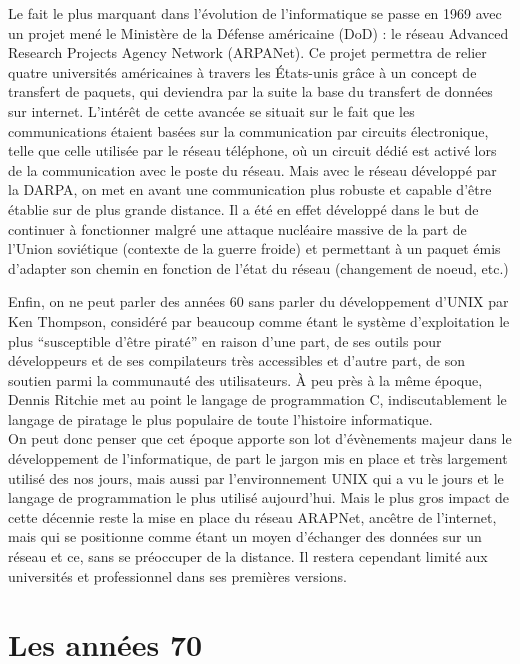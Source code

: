 \documentclass[a4paper]{memoir}
\begin{document}
Le fait le plus marquant dans l'évolution de l'informatique se passe en 1969 avec un projet mené le Ministère de la Défense américaine (DoD) : le réseau Advanced Research Projects Agency Network (ARPANet). Ce projet permettra de relier quatre universités américaines à travers les États-unis grâce à un concept de transfert de paquets, qui deviendra par la suite la base du transfert de données sur internet. L'intérêt de cette avancée se situait sur le fait que les communications étaient basées sur la communication par circuits électronique, telle que celle utilisée par le réseau téléphone, où un circuit dédié est activé lors de la communication avec le poste du réseau. Mais avec le réseau développé par la DARPA, on met en avant une communication plus robuste et capable d'être établie sur de plus grande distance. Il a été en effet développé dans le but de continuer à fonctionner malgré une attaque nucléaire massive de la part de l'Union soviétique (contexte de la guerre froide) et permettant à un paquet émis d'adapter son chemin en fonction de l'état du réseau (changement de noeud, etc.)

Enfin, on ne peut parler des années 60 sans parler du développement d'UNIX par Ken Thompson, considéré par beaucoup comme étant le système d'exploitation le plus ``susceptible d'être piraté'' en raison d'une part, de ses outils pour développeurs et de ses compilateurs très accessibles et d'autre part, de son soutien parmi la communauté des utilisateurs. À peu près à la même époque, Dennis Ritchie met au point le langage de programmation C, indiscutablement le langage de piratage le plus populaire de toute l'histoire informatique.\\

On peut donc penser que cet époque apporte son lot d'évènements majeur dans le développement de l'informatique, de part le jargon mis en place et très largement utilisé des nos jours, mais aussi par l'environnement UNIX qui a vu le jours et le langage de programmation le plus utilisé aujourd'hui. Mais le plus gros impact de cette décennie reste la mise en place du réseau ARAPNet, ancêtre de l'internet, mais qui se positionne comme étant un moyen d'échanger des données sur un réseau et ce, sans se préoccuper de la distance. Il restera cependant limité aux universités et professionnel dans ses premières versions.

\section{Les années 70}
\end{document}
